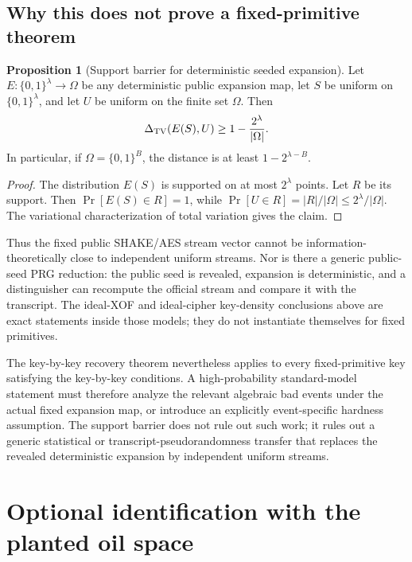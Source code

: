 \documentclass[11pt,a4paper]{article}
\theoremstyle{definition}
\newtheorem{proposition}[theorem]{Proposition}
\theoremstyle{remark}
\begin{document}
\subsection{Why this does not prove a fixed-primitive theorem}

\begin{proposition}[Support barrier for deterministic seeded expansion]\label{prop:seed-support-barrier}
Let $E:\{0,1\}^{\lambda}\to\Omega$ be any deterministic public expansion map, let $S$ be uniform on $\{0,1\}^{\lambda}$, and let $U$ be uniform on the finite set $\Omega$.  Then
\[
\Delta_{\rm TV}(E(S),U)
\ge 1-\frac{2^{\lambda}}{|\Omega|}.
\]
In particular, if $\Omega=\{0,1\}^B$, the distance is at least $1-2^{\lambda-B}$.
\end{proposition}

\begin{proof}
The distribution $E(S)$ is supported on at most $2^\lambda$ points.  Let $R$ be its support.  Then $\Pr[E(S)\in R]=1$, while $\Pr[U\in R]=|R|/|\Omega|\le2^\lambda/|\Omega|$.  The variational characterization of total variation gives the claim.
\end{proof}

Thus the fixed public SHAKE/AES stream vector cannot be information-theoretically close to independent uniform streams.  Nor is there a generic public-seed PRG reduction: the public seed is revealed, expansion is deterministic, and a distinguisher can recompute the official stream and compare it with the transcript.  The ideal-XOF and ideal-cipher key-density conclusions above are exact statements inside those models; they do not instantiate themselves for fixed primitives.

The key-by-key recovery theorem nevertheless applies to every fixed-primitive key satisfying the key-by-key conditions.  A high-probability standard-model statement must therefore analyze the relevant algebraic bad events under the actual fixed expansion map, or introduce an explicitly event-specific hardness assumption.  The support barrier does not rule out such work; it rules out a generic statistical or transcript-pseudorandomness transfer that replaces the revealed deterministic expansion by independent uniform streams.

\section{Optional identification with the planted oil space}\label{app:uniqueness}
\end{document}
